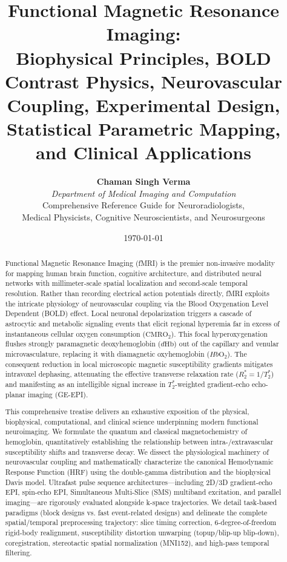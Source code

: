 \documentclass[11pt,a4paper]{article}
\title{\textbf{\huge Functional Magnetic Resonance Imaging:}\\[0.4em]
\Large Biophysical Principles, BOLD Contrast Physics, Neurovascular Coupling, Experimental Design, Statistical Parametric Mapping, and Clinical Applications}
\author{\textbf{Chaman Singh Verma} \\
\textit{Department of Medical Imaging and Computation} \\
\small \textsf{Comprehensive Reference Guide for Neuroradiologists,}\\[0.2em]
\small \textsf{Medical Physicists, Cognitive Neuroscientists, and Neurosurgeons}}
\date{\today}
\begin{document}
\maketitle

\begin{abstract}
Functional Magnetic Resonance Imaging (fMRI) is the premier non-invasive modality for mapping human brain function, cognitive architecture, and distributed neural networks with millimeter-scale spatial localization and second-scale temporal resolution. Rather than recording electrical action potentials directly, fMRI exploits the intricate physiology of neurovascular coupling via the Blood Oxygenation Level Dependent (BOLD) effect. Local neuronal depolarization triggers a cascade of astrocytic and metabolic signaling events that elicit regional hyperemia far in excess of instantaneous cellular oxygen consumption ($\text{CMRO}_2$). This focal hyperoxygenation flushes strongly paramagnetic deoxyhemoglobin ($d\text{Hb}$) out of the capillary and venular microvasculature, replacing it with diamagnetic oxyhemoglobin ($Hb\text{O}_2$). The consequent reduction in local microscopic magnetic susceptibility gradients mitigates intravoxel dephasing, attenuating the effective transverse relaxation rate ($R_2^* = 1/T_2^*$) and manifesting as an intelligible signal increase in $T_2^*$-weighted gradient-echo echo-planar imaging (GE-EPI).

This comprehensive treatise delivers an exhaustive exposition of the physical, biophysical, computational, and clinical science underpinning modern functional neuroimaging. We formulate the quantum and classical magnetochemistry of hemoglobin, quantitatively establishing the relationship between intra-/extravascular susceptibility shifts and transverse decay. We dissect the physiological machinery of neurovascular coupling and mathematically characterize the canonical Hemodynamic Response Function (HRF) using the double-gamma distribution and the biophysical Davis model. Ultrafast pulse sequence architectures—including 2D/3D gradient-echo EPI, spin-echo EPI, Simultaneous Multi-Slice (SMS) multiband excitation, and parallel imaging—are rigorously evaluated alongside k-space trajectories. We detail task-based paradigms (block designs vs. fast event-related designs) and delineate the complete spatial/temporal preprocessing trajectory: slice timing correction, 6-degree-of-freedom rigid-body realignment, susceptibility distortion unwarping (topup/blip-up blip-down), coregistration, stereotactic spatial normalization (MNI152), and high-pass temporal filtering.


\end{abstract}
\end{document}
